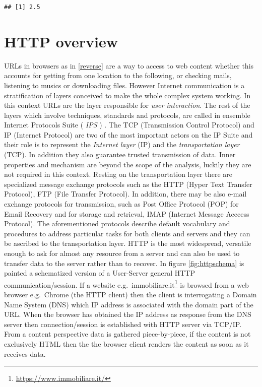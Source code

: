 \documentclass[
  12pt,
  a4paper,
  oneside]{book}
\DeclareRobustCommand{\href}[2]{#2\footnote{\url{#1}}}
\theoremstyle{definition}
\theoremstyle{definition}
\theoremstyle{definition}
\theoremstyle{remark}
\begin{document}
\begin{lstlisting}
## [1] 2.5
\end{lstlisting}

\hypertarget{HTTPmethod}{%
\section{HTTP overview}\label{HTTPmethod}}

URLs in browsers as in \ref{reverse} are a way to access to web content whether this accounts for getting from one location to the following, or checking mails, listening to musics or downloading files. However Internet communication is a stratification of layers conceived to make the whole complex system working. In this context URLs are the layer responsible for \emph{user interaction}. The rest of the layers which involve techniques, standards and protocols, are called in ensemble Internet Protocols Suite ( \emph{IPS} ) \citeyearpar{automateddatacollection}. The TCP (Transmission Control Protocol) and IP (Internet Protocol) are two of the most important actors on the IP Suite and their role is to represent the \emph{Internet layer} (IP) and the \emph{transportation layer} (TCP). In addition they also guarantee trusted transmission of data. Inner properties and mechanism are beyond the scope of the analysis, luckily they are not required in this context. Resting on the transportation layer there are specialized message exchange protocols such as the HTTP (Hyper Text Transfer Protocol), FTP (File Transfer Protocol). In addition, there may be also e-mail exchange protocols for transmission, such as Post Office Protocol (POP) for Email Recovery and for storage and retrieval, IMAP (Internet Message Acccess Protocol). The aforementioned protocols describe default vocabulary and procedures to address particular tasks for both clients and servers and they can be ascribed to the transportation layer. HTTP is the most widespread, versatile enough to ask for almost any resource from a server and can also be used to transfer data to the server rather than to recover. In figure \ref{fig:httpschema} is painted a schematized version of a User-Server general HTTP communication/session. If a website e.g.~\href{https://www.immobiliare.it/}{immobiliare.it} is browsed from a web browser e.g.~Chrome (the HTTP client) then the client is interrogating a Domain Name System (DNS) which IP address is associated with the domain part of the URL. When the browser has obtained the IP address as response from the DNS server then connection/session is established with HTTP server via TCP/IP. From a content perspective data is gathered piece-by-piece, if the content is not exclusively HTML then the the browser client renders the content as soon as it receives data.
\end{document}
